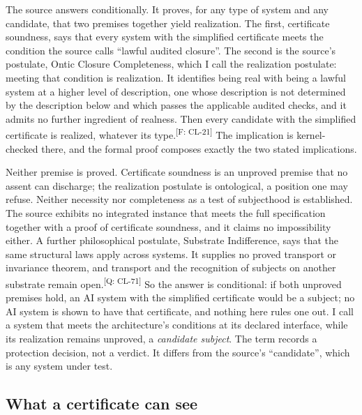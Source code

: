 \documentclass[pdflatex,sn-basic]{sn-jnl}%
\newcommand{\claim}[2]{\ifannotated\textsuperscript{\textcolor{blue!60!black}{\tiny[#1: #2]}}\fi}
\newcommand{\enquote}[1]{``#1''}
\begin{document}
The source answers conditionally. It proves, for any type of system and any candidate, that two premises together yield realization. The first, certificate soundness, says that every system with the simplified certificate meets the condition the source calls \enquote{lawful audited closure}. The second is the source's postulate, Ontic Closure Completeness, which I call the realization postulate: meeting that condition is realization. It identifies being real with being a lawful system at a higher level of description, one whose description is not determined by the description below and which passes the applicable audited checks, and it admits no further ingredient of realness. Then every candidate with the simplified certificate is realized, whatever its type.\claim{F}{CL-21} The implication is kernel-checked there, and the formal proof composes exactly the two stated implications.

Neither premise is proved. Certificate soundness is an unproved premise that no assent can discharge; the realization postulate is ontological, a position one may refuse. Neither necessity nor completeness as a test of subjecthood is established. The source exhibits no integrated instance that meets the full specification together with a proof of certificate soundness, and it claims no impossibility either. A further philosophical postulate, Substrate Indifference, says that the same structural laws apply across systems. It supplies no proved transport or invariance theorem, and transport and the recognition of subjects on another substrate remain open.\claim{Q}{CL-71} So the answer is conditional: if both unproved premises hold, an AI system with the simplified certificate would be a subject; no AI system is shown to have that certificate, and nothing here rules one out. I call a system that meets the architecture's conditions at its declared interface, while its realization remains unproved, a \emph{candidate subject}. The term records a protection decision, not a verdict. It differs from the source's \enquote{candidate}, which is any system under test.

\subsection{What a certificate can see}\label{sec:interface}
\end{document}
